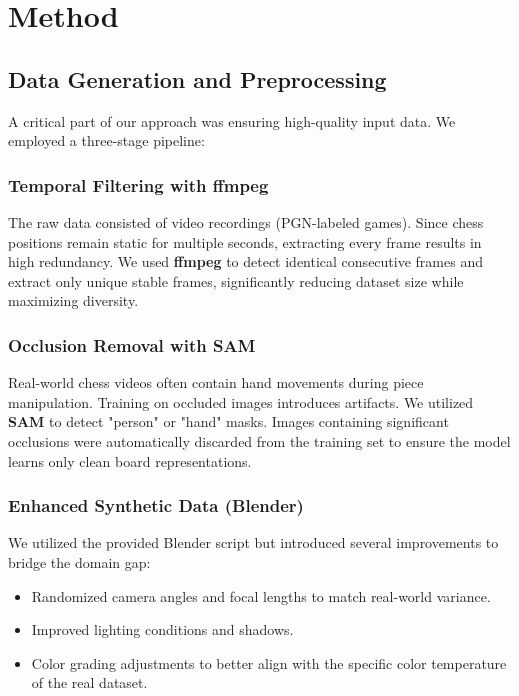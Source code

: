 \documentclass[12pt,a4paper]{article}
\begin{document}
\section{Method}
\label{sec:method}

\subsection{Data Generation and Preprocessing}
\label{subsec:data_gen}
A critical part of our approach was ensuring high-quality input data. We employed a three-stage pipeline:

\subsubsection{Temporal Filtering with ffmpeg}
The raw data consisted of video recordings (PGN-labeled games). Since chess positions remain static for multiple seconds, extracting every frame results in high redundancy. We used \textbf{ffmpeg} to detect identical consecutive frames and extract only unique stable frames, significantly reducing dataset size while maximizing diversity.

\subsubsection{Occlusion Removal with SAM}
Real-world chess videos often contain hand movements during piece manipulation. Training on occluded images introduces artifacts. We utilized \textbf{SAM} \cite{sam2023} to detect "person" or "hand" masks. Images containing significant occlusions were automatically discarded from the training set to ensure the model learns only clean board representations.

\subsubsection{Enhanced Synthetic Data (Blender)}
We utilized the provided Blender script but introduced several improvements to bridge the domain gap:
\begin{itemize}
    \item Randomized camera angles and focal lengths to match real-world variance.
    \item Improved lighting conditions and shadows.
    \item Color grading adjustments to better align with the specific color temperature of the real dataset.
\end{itemize}
\end{document}
